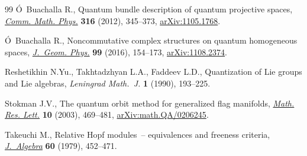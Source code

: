 \documentclass[10pt,a4paper]{amsart}
\numberwithin{equation}{section}
\begin{document}
\begin{thebibliography}{99}
\'O~Buachalla R., Quantum bundle description of quantum projective spaces,
 \href{https://doi.org/10.1007/s00220-012-1577-x}{\textit{Comm. Math. Phys.}} \textbf{316} (2012), 345--373, \href{https://arxiv.org/abs/1105.1768}{arXiv:1105.1768}.

\'O~Buachalla R., Noncommutative complex structures on quantum homogeneous
 spaces, \href{https://doi.org/10.1016/j.geomphys.2015.10.003}{\textit{J.~Geom. Phys.}} \textbf{99} (2016), 154--173,
 \href{https://arxiv.org/abs/1108.2374}{arXiv:1108.2374}.

Reshetikhin N.Yu., Takhtadzhyan L.A., Faddeev L.D., Quantization of {L}ie groups
 and {L}ie algebras, \textit{Leningrad Math.~J.} \textbf{1} (1990), 193--225.

Stokman J.V., The quantum orbit method for generalized flag manifolds,
 \href{https://doi.org/10.4310/MRL.2003.v10.n4.a6}{\textit{Math. Res. Lett.}} \textbf{10} (2003), 469--481,
 \href{https://arxiv.org/abs/math.QA/0206245}{arXiv:math.QA/0206245}.

Takeuchi M., Relative {H}opf modules~-- equivalences and freeness criteria,
 \href{https://doi.org/10.1016/0021-8693(79)90093-0}{\textit{J.~Algebra}} \textbf{60} (1979), 452--471.

\end{thebibliography}
\end{document}
